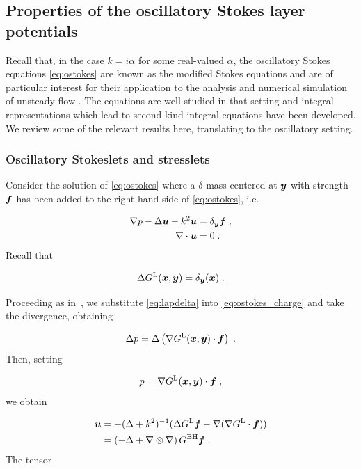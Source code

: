 \subsection{Properties of the oscillatory Stokes layer
  potentials}

Recall that, in the case $k=i\alpha$ for some real-valued $\alpha$,
the oscillatory Stokes equations \cref{eq:ostokes}
are known as the modified Stokes equations and are of particular
interest for their application to the analysis and numerical
simulation of unsteady flow
\cite{Pozrikidis1992,biros2002embedded,jiang2013second,ladyzhenskaya1969mathematical}.
The equations are well-studied in that setting and
integral representations which lead to second-kind
integral equations have been developed. We review
some of the relevant results here, translating to
the oscillatory setting.

\subsubsection{Oscillatory Stokeslets and stresslets}
Consider the solution of
\cref{eq:ostokes} where a $\delta$-mass
centered at ${\boldsymbol y}$ with strength ${\boldsymbol f}$
has been added to the right-hand side of \cref{eq:ostokes}, i.e.

\begin{align}
  \nabla p - \Delta {\boldsymbol u} - k^2 {\boldsymbol u} &= \delta_{\boldsymbol y} {\boldsymbol f} \; ,
  \label{eq:ostokes_charge}  \\
  \nabla \cdot {\boldsymbol u} &= 0 \; . \nonumber
\end{align}
Recall that

\begin{equation}
 \Delta G^{\textrm{L}}({\boldsymbol x},{\boldsymbol y}) = \delta_{\boldsymbol y}({\boldsymbol x}) \; . \label{eq:lapdelta}
\end{equation}
    {\color{red}
      Proceeding as in~\cite{biros2002embedded},
      we substitute \eqref{eq:lapdelta} into
      \eqref{eq:ostokes_charge} and take the divergence,
      obtaining
      
\begin{equation}
  \Delta p = \Delta \left (\nabla G^{\textrm{L}}({\boldsymbol x},{\boldsymbol y}) \cdot {\boldsymbol f}
  \right ) \; . \nonumber
\end{equation}
Then, setting

\begin{equation}
p = \nabla G^{\textrm{L}}({\boldsymbol x},{\boldsymbol y}) \cdot {\boldsymbol f} \; ,\nonumber
\end{equation}
we obtain}

\begin{align}
  {\boldsymbol u} &= - (\Delta + k^2)^{-1} ( \Delta G^{\textrm{L}} {\boldsymbol f}
  - \nabla (\nabla G^{\textrm{L}} \cdot {\boldsymbol f} ) ) \nonumber \\
  &= \left ( -\Delta + \nabla \otimes \nabla \right )
  G^{\textrm{BH}} {\boldsymbol f} \; . \nonumber
\end{align}
The tensor

